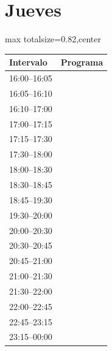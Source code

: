 \documentclass[11pt,a4paper]{article}
\begin{document}
\clearpage
\section*{Jueves}
\begin{center}
\begin{adjustbox}{max totalsize={\textwidth}{0.82\textheight},center}
\begin{tabular}{|p{3.6cm}|p{11cm}|}
\hline
\textbf{Intervalo} & \textbf{Programa} \\
\hline
{\centering\rule{0pt}{0.93ex}16:00--16:05} & {\centering\rule{0pt}{0.93ex}} \\
{\centering\rule{0pt}{0.93ex}16:05--16:10} & {\centering\rule{0pt}{0.93ex}} \\
{\centering\rule{0pt}{9.33ex}16:10--17:00} & {\centering\rule{0pt}{9.33ex}} \\
{\centering\rule{0pt}{2.80ex}17:00--17:15} & {\centering\rule{0pt}{2.80ex}} \\
{\centering\rule{0pt}{2.80ex}17:15--17:30} & {\centering\rule{0pt}{2.80ex}} \\
{\centering\rule{0pt}{5.60ex}17:30--18:00} & {\centering\rule{0pt}{5.60ex}} \\
{\centering\rule{0pt}{5.60ex}18:00--18:30} & {\centering\rule{0pt}{5.60ex}} \\
{\centering\rule{0pt}{2.80ex}18:30--18:45} & {\centering\rule{0pt}{2.80ex}} \\
{\centering\rule{0pt}{8.40ex}18:45--19:30} & {\centering\rule{0pt}{8.40ex}} \\
{\centering\rule{0pt}{5.60ex}19:30--20:00} & {\centering\rule{0pt}{5.60ex}} \\
{\centering\rule{0pt}{5.60ex}20:00--20:30} & {\centering\rule{0pt}{5.60ex}} \\
{\centering\rule{0pt}{2.80ex}20:30--20:45} & {\centering\rule{0pt}{2.80ex}} \\
{\centering\rule{0pt}{2.80ex}20:45--21:00} & {\centering\rule{0pt}{2.80ex}} \\
{\centering\rule{0pt}{5.60ex}21:00--21:30} & {\centering\rule{0pt}{5.60ex}} \\
{\centering\rule{0pt}{5.60ex}21:30--22:00} & {\centering\rule{0pt}{5.60ex}} \\
{\centering\rule{0pt}{8.40ex}22:00--22:45} & {\centering\rule{0pt}{8.40ex}} \\
{\centering\rule{0pt}{5.60ex}22:45--23:15} & {\centering\rule{0pt}{5.60ex}} \\
{\centering\rule{0pt}{8.40ex}23:15--00:00} & {\centering\rule{0pt}{8.40ex}} \\
\hline
\end{tabular}
\end{adjustbox}
\end{center}
\end{document}
